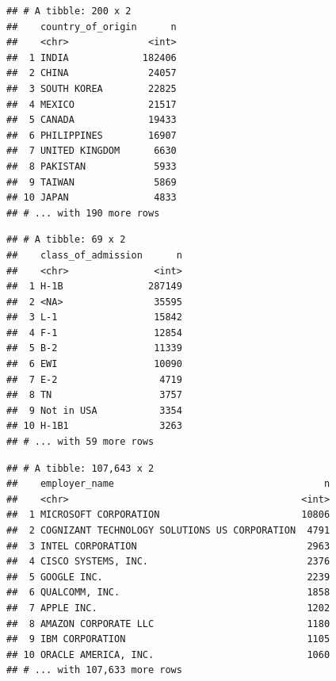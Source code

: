 \documentclass[]{article}
\newenvironment{Shaded}{\begin{snugshade}}{\end{snugshade}}
\newcommand{\KeywordTok}[1]{\textcolor[rgb]{0.13,0.29,0.53}{\textbf{#1}}}
\newcommand{\DataTypeTok}[1]{\textcolor[rgb]{0.13,0.29,0.53}{#1}}
\newcommand{\StringTok}[1]{\textcolor[rgb]{0.31,0.60,0.02}{#1}}
\newcommand{\CommentTok}[1]{\textcolor[rgb]{0.56,0.35,0.01}{\textit{#1}}}
\newcommand{\OperatorTok}[1]{\textcolor[rgb]{0.81,0.36,0.00}{\textbf{#1}}}
\newcommand{\NormalTok}[1]{#1}
\begin{document}
\begin{verbatim}
## # A tibble: 200 x 2
##    country_of_origin      n
##    <chr>              <int>
##  1 INDIA             182406
##  2 CHINA              24057
##  3 SOUTH KOREA        22825
##  4 MEXICO             21517
##  5 CANADA             19433
##  6 PHILIPPINES        16907
##  7 UNITED KINGDOM      6630
##  8 PAKISTAN            5933
##  9 TAIWAN              5869
## 10 JAPAN               4833
## # ... with 190 more rows
\end{verbatim}

\begin{Shaded}
\end{Shaded}

\begin{verbatim}
## # A tibble: 69 x 2
##    class_of_admission      n
##    <chr>               <int>
##  1 H-1B               287149
##  2 <NA>                35595
##  3 L-1                 15842
##  4 F-1                 12854
##  5 B-2                 11339
##  6 EWI                 10090
##  7 E-2                  4719
##  8 TN                   3757
##  9 Not in USA           3354
## 10 H-1B1                3263
## # ... with 59 more rows
\end{verbatim}

\begin{Shaded}
\end{Shaded}

\begin{verbatim}
## # A tibble: 107,643 x 2
##    employer_name                                     n
##    <chr>                                         <int>
##  1 MICROSOFT CORPORATION                         10806
##  2 COGNIZANT TECHNOLOGY SOLUTIONS US CORPORATION  4791
##  3 INTEL CORPORATION                              2963
##  4 CISCO SYSTEMS, INC.                            2376
##  5 GOOGLE INC.                                    2239
##  6 QUALCOMM, INC.                                 1858
##  7 APPLE INC.                                     1202
##  8 AMAZON CORPORATE LLC                           1180
##  9 IBM CORPORATION                                1105
## 10 ORACLE AMERICA, INC.                           1060
## # ... with 107,633 more rows
\end{verbatim}
\end{document}
